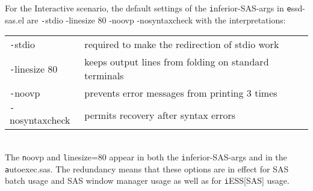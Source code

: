\documentclass{article}
\begin{document}
For the Interactive scenario,
the default settings of the {\texttt inferior-SAS-args} in {\texttt essd-sas.el}
are {\texttt -stdio -linesize 80 -noovp -nosyntaxcheck}
with the interpretations:\\
\begin{tabular}{ll}
\texttt  -stdio          &required to make the redirection of stdio work       \\
\texttt  -linesize 80    &keeps output lines from folding on standard terminals\\
\texttt  -noovp          &prevents error messages from printing 3 times        \\
\texttt  -nosyntaxcheck  &permits recovery after syntax errors                 \\
\end{tabular}\\
The {\texttt noovp} and {\texttt linesize=80} appear in both the
{\texttt inferior-SAS-args} and in the {\texttt autoexec.sas}.  The
redundancy means that these options are in effect for SAS batch usage
and SAS window manager usage as well as for {\texttt iESS[SAS]} usage.
\end{document}

